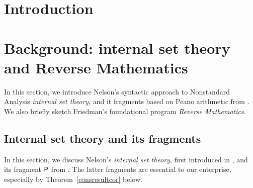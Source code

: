 \documentclass[reqno]{amsart}
\def\P{\textup{\textsf{P}}}
\numberwithin{equation}{section}
\numberwithin{thm}{section}
\begin{document}
\maketitle
\thispagestyle{empty}

%
\newpage
\tableofcontents

\section{Introduction}


\section{Background: internal set theory and Reverse Mathematics}\label{base}
In this section, we introduce Nelson's syntactic approach to Nonstandard Analysis \emph{internal set theory}, and it fragments based on Peano arithmetic from \cite{brie}. 
We also briefly sketch Friedman's foundational program \emph{Reverse Mathematics}.  
\subsection{Internal set theory and its fragments}\label{P}
In this section, we discuss Nelson's \emph{internal set theory}, first introduced in \cite{wownelly}, and its fragment $\P$ from \cite{brie}.  
The latter fragments are essential to our enterprise, especially by Theorem~\ref{consresultcor} below.  
\end{document}

